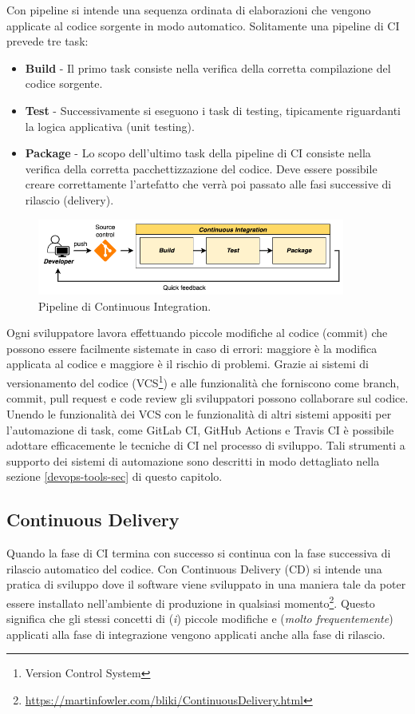 Con pipeline si intende una sequenza ordinata di elaborazioni che vengono applicate al codice sorgente in modo automatico. Solitamente una pipeline di CI prevede tre task:

\begin{itemize}
    \item \textbf{Build} - Il primo task consiste nella verifica della corretta compilazione del codice sorgente.
    \item \textbf{Test} - Successivamente si eseguono i task di testing, tipicamente riguardanti la logica applicativa (unit testing).
    \item \textbf{Package} - Lo scopo dell'ultimo task della pipeline di CI consiste nella verifica della corretta pacchettizzazione del codice. Deve essere possibile creare correttamente l'artefatto che verrà poi passato alle fasi successive di rilascio (delivery).
\end{itemize}

\begin{figure}[H]
    \centering
    \includegraphics[width=0.9\textwidth]{img/ci-pipeline.png}
    \caption{Pipeline di Continuous Integration.}
    \label{ci-pipeline}
\end{figure}

Ogni sviluppatore lavora effettuando piccole modifiche al codice (commit) che possono essere facilmente sistemate in caso di errori: maggiore è la modifica applicata al codice e maggiore è il rischio di problemi. Grazie ai sistemi di versionamento del codice (VCS\footnote{Version Control System}) e alle funzionalità che forniscono come branch, commit, pull request e code review gli sviluppatori possono collaborare sul codice. Unendo le funzionalità dei VCS con le funzionalità di altri sistemi appositi per l'automazione di task, come GitLab CI, GitHub Actions e Travis CI è possibile adottare efficacemente le tecniche di CI nel processo di sviluppo. Tali strumenti a supporto dei sistemi di automazione sono descritti in modo dettagliato nella sezione \ref{devops-tools-sec} di questo capitolo.

\subsection{Continuous Delivery}
Quando la fase di CI termina con successo si continua con la fase successiva di rilascio automatico del codice. Con Continuous Delivery (CD) si intende una pratica di sviluppo dove il software viene sviluppato in una maniera tale da poter essere installato nell'ambiente di produzione in qualsiasi momento\footnote{\href{https://martinfowler.com/bliki/ContinuousDelivery.html}{https://martinfowler.com/bliki/ContinuousDelivery.html}}. Questo significa che gli stessi concetti di (\textit{i}) piccole modifiche e (\textit{molto frequentemente}) applicati alla fase di integrazione vengono applicati anche alla fase di rilascio.

